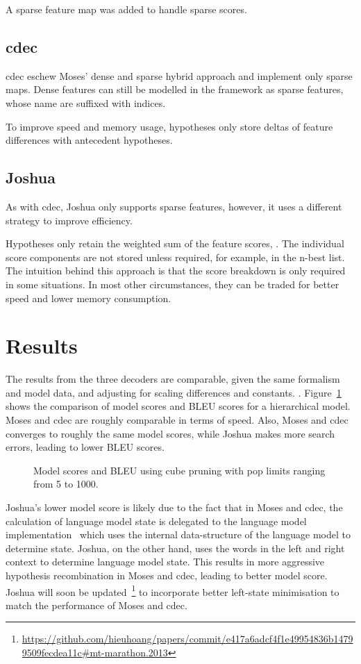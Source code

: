 \documentclass{pbml}
\begin{document}
A sparse feature map was added to handle sparse scores.

\subsection{cdec}
cdec eschew Moses' dense and sparse hybrid approach and implement only sparse maps. Dense features can still be modelled in the framework as sparse features, whose name are suffixed with indices.

To improve speed and memory usage, hypotheses only store deltas of feature differences with antecedent hypotheses.

\subsection{Joshua}
As with cdec, Joshua only supports sparse features, however, it uses a different strategy to improve efficiency.

Hypotheses only retain the weighted sum of the feature scores, . The individual score components are not stored unless required, for example, in the n-best list. The intuition behind this approach is that the score breakdown is only required in some situations. In most other circumstances, they can be traded for better speed and lower memory consumption.
  
\section{Results}

The results from the three decoders are comparable, given the same formalism and model data, and adjusting for scaling differences and constants. . Figure~\ref{fig:model} shows the comparison of model scores and BLEU scores for a hierarchical model. Moses and cdec are roughly comparable in terms of speed. Also, Moses and cdec converges to roughly the same model scores, while Joshua makes more search errors, leading to lower BLEU scores.

\begin{figure}

\caption{\label{fig:model}Model scores and BLEU using cube pruning with pop limits ranging from 5 to 1000.}
\end{figure} 

Joshua's lower model score is likely due to the fact that in Moses and cdec, the calculation of language model state is delegated to the language model implementation~\cite{Heafield-left} which uses the internal data-structure of the language model to determine state. Joshua, on the other hand, uses the words in the left and right context to determine language model state. This results in more aggressive hypothesis recombination in Moses and cdec, leading to better model score. Joshua will soon be updated~\footnote{\url{https://github.com/hieuhoang/papers/commit/e417a6adcf4f1e49954836b14799509fecdea11c#mt-marathon.2013} } to incorporate better left-state minimisation to match the performance of Moses and cdec. 
\end{document}
